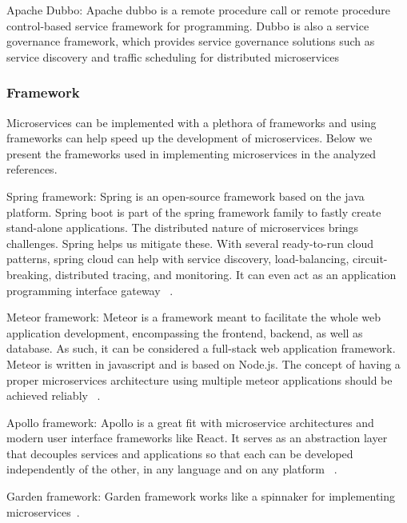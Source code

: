 \par Apache Dubbo: Apache dubbo is a remote procedure call or remote procedure control-based service framework for programming. Dubbo is also a service governance framework, which provides service governance solutions such as service discovery and traffic scheduling for distributed microservices~\cite{Zhang2019}


\subsubsection{Framework}

Microservices can be implemented with a plethora of frameworks and using frameworks can help speed up the development of microservices. Below we present the frameworks used in implementing microservices in the analyzed references.

\par Spring framework: Spring is an open-source framework based on the java platform. Spring boot is part of the spring framework family to fastly create stand-alone applications. The distributed nature of microservices brings challenges. Spring helps us mitigate these. With several ready-to-run cloud patterns, spring cloud can help with service discovery, load-balancing, circuit-breaking, distributed tracing, and monitoring. It can even act as an application programming interface gateway ~\cite{KalskeM2017, selmadji2020, Santos2020}.

\par Meteor framework: Meteor is a framework meant to facilitate the whole web application development, encompassing the frontend, backend, as well as database. As such, it can be considered a full-stack web application framework. Meteor is written in javascript and is based on Node.js. The concept of having a proper microservices architecture using multiple meteor applications should be achieved reliably ~\cite{Tuuli2020}.


\par Apollo framework: Apollo is a great fit with microservice architectures and modern user interface frameworks like React. It serves as an abstraction layer that decouples services and applications so that each can be developed independently of the other, in any language and on any platform ~\cite{Kevin2015}.

\par Garden framework: Garden framework works like a spinnaker for implementing microservices~\cite{Ellen2018}.

